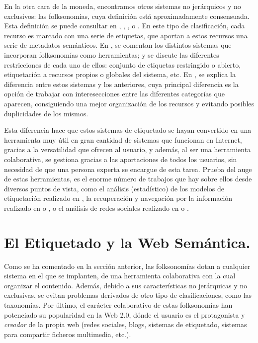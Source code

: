 En la otra cara de la moneda, encontramos otros sistemas no jerárquicos y no exclusivos: las folksonomías, cuya definición está aproximadamente consensuada. Esta definición se puede consultar en  \cite{smith}, \cite{kim}, \cite{golder}, \cite{gruber} o \cite{knerr}. En este tipo de clasificación, cada recurso es marcado con una serie de etiquetas, que aportan a estos recursos una serie de metadatos semánticos. En \cite{smith}, se comentan los distintos sistemas que incorporan folksonomías como herramientas; y se discute las diferentes restricciones de cada uno de ellos: conjunto de etiquetas restringido o abierto, etiquetación a recursos propios o globales del sistema, etc. En \cite{golder}, se explica la diferencia entre estos sistemas y los anteriores, cuya principal diferencia es la opción de trabajar con interesecciones entre las diferentes categorías que aparecen, consiguiendo una mejor organización de los recursos y evitando posibles duplicidades de los mismos.

Esta diferencia hace que estos sistemas de etiquetado se hayan convertido en una herramienta muy útil en gran cantidad de sistemas que funcionan en Internet, gracias a la versatilidad que ofrecen al usuario, y además, al ser una herramienta colaborativa, se gestiona gracias a las aportaciones de todos los usuarios, sin necesidad de que una persona experta se encargue de esta tarea. Prueba del auge de estas herramientas, es el enorme número de trabajos que hay sobre ellos desde diversos puntos de vista, como el análisis (estadístico) de los modelos de etiquetación realizado en \cite{golder}, la recuperación y navegación por la información realizado en \cite{halpin} o \cite{jaschke}, o el análisis de redes sociales realizado en \cite{mika} o \cite{brooks}.


\section{El Etiquetado y la Web Semántica.}

Como se ha comentado en la sección anterior, las folksonomías dotan a cualquier sistema en el que se implanten, de una herramienta colaborativa con la cual organizar el contenido. Además, debido a sus características no jerárquicas y no exclusivas, se evitan problemas derivados de otro tipo de clasificaciones, como las taxonomías. Por último, el carácter colaborativo de estas folksonomías han potenciado su popularidad en la Web 2.0, dónde el usuario es el protagonista y \emph{creador} de la propia web (redes sociales, blogs, sistemas de etiquetado, sistemas para compartir ficheros multimedia, etc.).

